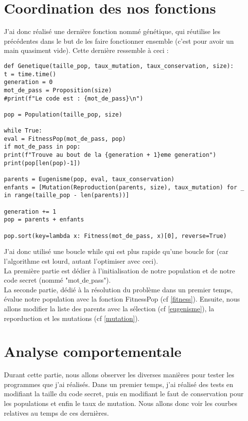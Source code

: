 \documentclass[french,12pt,a4paper]{report}
\begin{document}
\chapter{Coordination des nos fonctions}
J'ai donc réalisé une dernière fonction nommé génétique, qui réutilise les précédentes dans le but de les faire fonctionner ensemble (c'est pour avoir un main quasiment vide). Cette dernière ressemble à ceci :
\begin{lstlisting}[style = python]
def Genetique(taille_pop, taux_mutation, taux_conservation, size):
t = time.time()
generation = 0
mot_de_pass = Proposition(size)
#print(f"Le code est : {mot_de_pass}\n")

pop = Population(taille_pop, size)

while True:
eval = FitnessPop(mot_de_pass, pop)
if mot_de_pass in pop:
print(f"Trouve au bout de la {generation + 1}eme generation")
print(pop[len(pop)-1])

parents = Eugenisme(pop, eval, taux_conservation)
enfants = [Mutation(Reproduction(parents, size), taux_mutation) for _ in range(taille_pop - len(parents))]

generation += 1
pop = parents + enfants

pop.sort(key=lambda x: Fitness(mot_de_pass, x)[0], reverse=True)
\end{lstlisting}
\vspace{0.2cm}
J'ai donc utilisé une boucle while qui est plus rapide qu'une boucle for (car l'algorithme est lourd, autant l'optimiser avec ceci).\\
La première partie est dédier à l'initialisation de notre population et de notre code secret (nommé "mot$\_$de$\_$pass"). \\
La seconde partie, dédié à la résolution du problème dans un premier temps, évalue notre population avec la fonction FitnessPop (cf \ref{fitness}). Ensuite, nous allons modifier la liste des parents avec la sélection (cf \ref{eugenisme}), la reporduction et les mutations (cf \ref{mutation}).
\chapter{Analyse comportementale}
Durant cette partie, nous allons observer les diverses manières pour tester les programmes que j'ai réalisés. Dans un premier temps, j'ai réalisé des tests en modifiant la taille du code secret, puis en modifiant le faut de conservation pour les populations et enfin le taux de mutation. Nous allons donc voir les courbes relatives au temps de ces dernières.
\end{document}
